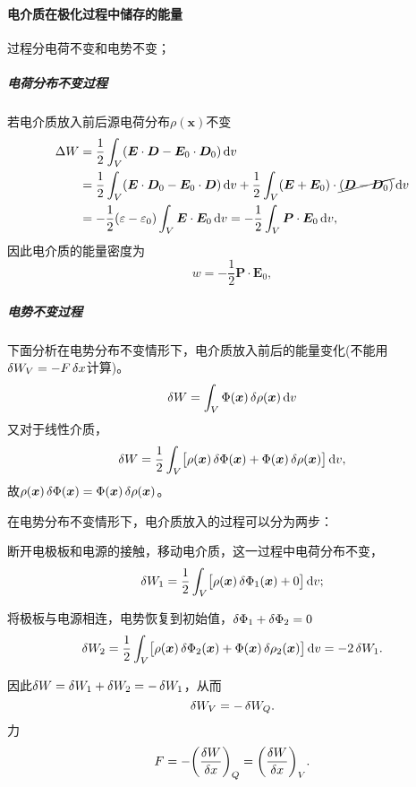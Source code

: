 \paragraph{电介质在极化过程中储存的能量}过程分电荷不变和电势不变；
\subparagraph{电荷分布不变过程}
若电介质放入前后源电荷分布$\rho(\bm x)$不变
\begin{align*}
    \Delta W&=\frac12\int_V(\bm E\cdot\bm D-\bm E_0\cdot\bm D_0)\mathop{}\!\mathrm{d} v\\
    &=\frac12\int_V(\bm E\cdot\bm D_0-\bm E_0\cdot\bm D)\mathop{}\!\mathrm{d} v+\frac12\int_V(\bm E+\bm E_0)\cdot\cancel{(\bm D-\bm D_0)}\mathop{}\!\mathrm{d} v\\
    &=-\frac12(\varepsilon-\varepsilon_0)\int_V\bm E\cdot\bm E_0\mathop{}\!\mathrm{d} v=-\frac12\int_V\bm P\cdot\bm E_0\mathop{}\!\mathrm{d} v,
\end{align*}
因此电介质的能量密度为
\begin{equation}
    w=-\frac12\bm P\cdot\bm E_0,
\end{equation}
\subparagraph{电势不变过程}下面分析在电势分布不变情形下，电介质放入前后的能量变化(不能用$\mathop{}\!\delta W_V=-F\mathop{}\!\delta x$计算)。
\[
    \mathop{}\!\delta W=\int_V\Phi(\bm x)\mathop{}\!\delta\rho(\bm x)\mathop{}\!\mathrm{d} v
\]
又对于线性介质，
\[
    \mathop{}\!\delta W=\frac12\int_V\bigl[\rho(\bm x)\mathop{}\!\delta\Phi(\bm x)+\Phi(\bm x)\mathop{}\!\delta\rho(\bm x)\bigr]\mathop{}\!\mathrm{d} v,
\]
故$\rho(\bm x)\mathop{}\!\delta\Phi(\bm x)=\Phi(\bm x)\mathop{}\!\delta\rho(\bm x)$。

在电势分布不变情形下，电介质放入的过程可以分为两步：
\begin{compactenum}
    \item 断开电极板和电源的接触，移动电介质，这一过程中电荷分布不变，
    \[
        \mathop{}\!\delta W_1=\frac12\int_V\bigl[\rho(\bm x)\mathop{}\!\delta\Phi_1(\bm x)+0\bigr]\mathop{}\!\mathrm{d} v;
    \]
    \item 将极板与电源相连，电势恢复到初始值，$\mathop{}\!\delta\Phi_1+\mathop{}\!\delta\Phi_2=0$
    \[
        \mathop{}\!\delta W_2=\frac12\int_V\bigl[\rho(\bm x)\mathop{}\!\delta\Phi_2(\bm x)+\Phi(\bm x)\mathop{}\!\delta\rho_2(\bm x)\bigr]\mathop{}\!\mathrm{d} v=-2\mathop{}\!\delta W_1.
    \]
\end{compactenum}
因此$\mathop{}\!\delta W=\mathop{}\!\delta W_1+\mathop{}\!\delta W_2=-\mathop{}\!\delta W_1$，从而
\[
    \mathop{}\!\delta W_V=-\mathop{}\!\delta W_Q.
\]
力
\[
    F=-\biggl(\frac{\mathop{}\!\delta W}{\mathop{}\!\delta x}\biggr)_Q=\biggl(\frac{\mathop{}\!\delta W}{\mathop{}\!\delta x}\biggr)_V.
\]

